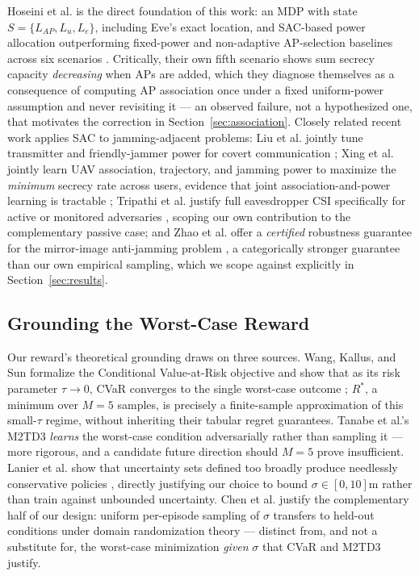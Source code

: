 \documentclass[conference]{IEEEtran}
\begin{document}
Hoseini et al. is the direct foundation of this work: an MDP with state $S=\{L_{AP},L_u,L_e\}$, including Eve's exact location, and SAC-based power allocation outperforming fixed-power and non-adaptive AP-selection baselines across six scenarios \cite{hoseini}. Critically, their own fifth scenario shows sum secrecy capacity \emph{decreasing} when APs are added, which they diagnose themselves as a consequence of computing AP association once under a fixed uniform-power assumption and never revisiting it --- an observed failure, not a hypothesized one, that motivates the correction in Section~\ref{sec:association}. Closely related recent work applies SAC to jamming-adjacent problems: Liu et al. jointly tune transmitter and friendly-jammer power for covert communication \cite{covertsac}; Xing et al. jointly learn UAV association, trajectory, and jamming power to maximize the \emph{minimum} secrecy rate across users, evidence that joint association-and-power learning is tractable \cite{xing24}; Tripathi et al. justify full eavesdropper CSI specifically for active or monitored adversaries \cite{tripathi24}, scoping our own contribution to the complementary passive case; and Zhao et al. offer a \emph{certified} robustness guarantee for the mirror-image anti-jamming problem \cite{zhao25}, a categorically stronger guarantee than our own empirical sampling, which we scope against explicitly in Section~\ref{sec:results}.

\subsection{Grounding the Worst-Case Reward}

Our reward's theoretical grounding draws on three sources. Wang, Kallus, and Sun formalize the Conditional Value-at-Risk objective and show that as its risk parameter $\tau \to 0$, CVaR converges to the single worst-case outcome \cite{cvar}; $R^*$, a minimum over $M=5$ samples, is precisely a finite-sample approximation of this small-$\tau$ regime, without inheriting their tabular regret guarantees. Tanabe et al.'s M2TD3 \emph{learns} the worst-case condition adversarially rather than sampling it \cite{m2td3} --- more rigorous, and a candidate future direction should $M=5$ prove insufficient. Lanier et al. show that uncertainty sets defined too broadly produce needlessly conservative policies \cite{farr}, directly justifying our choice to bound $\sigma \in [0,10]$m rather than train against unbounded uncertainty. Chen et al. justify the complementary half of our design: uniform per-episode sampling of $\sigma$ transfers to held-out conditions under domain randomization theory \cite{domainrand} --- distinct from, and not a substitute for, the worst-case minimization \emph{given} $\sigma$ that CVaR and M2TD3 justify.
\end{document}
